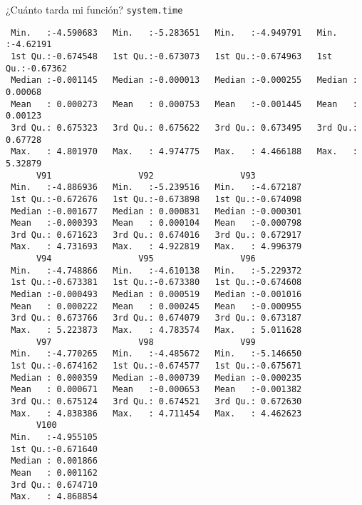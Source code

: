 \documentclass[xcolor={usenames,svgnames,dvipsnames}]{beamer}
\begin{document}
\begin{frame}[label={sec:org4570aee},fragile]{¿Cuánto tarda mi función? \texttt{system.time}}
\begin{verbatim}
 Min.   :-4.590683   Min.   :-5.283651   Min.   :-4.949791   Min.   :-4.62191  
 1st Qu.:-0.674548   1st Qu.:-0.673073   1st Qu.:-0.674963   1st Qu.:-0.67362  
 Median :-0.001145   Median :-0.000013   Median :-0.000255   Median : 0.00068  
 Mean   : 0.000273   Mean   : 0.000753   Mean   :-0.001445   Mean   : 0.00123  
 3rd Qu.: 0.675323   3rd Qu.: 0.675622   3rd Qu.: 0.673495   3rd Qu.: 0.67728  
 Max.   : 4.801970   Max.   : 4.974775   Max.   : 4.466188   Max.   : 5.32879  
      V91                 V92                 V93           
 Min.   :-4.886936   Min.   :-5.239516   Min.   :-4.672187  
 1st Qu.:-0.672676   1st Qu.:-0.673898   1st Qu.:-0.674098  
 Median :-0.001677   Median : 0.000831   Median :-0.000301  
 Mean   :-0.000393   Mean   : 0.000104   Mean   :-0.000798  
 3rd Qu.: 0.671623   3rd Qu.: 0.674016   3rd Qu.: 0.672917  
 Max.   : 4.731693   Max.   : 4.922819   Max.   : 4.996379  
      V94                 V95                 V96           
 Min.   :-4.748866   Min.   :-4.610138   Min.   :-5.229372  
 1st Qu.:-0.673381   1st Qu.:-0.673380   1st Qu.:-0.674608  
 Median :-0.000493   Median : 0.000519   Median :-0.001016  
 Mean   : 0.000222   Mean   : 0.000245   Mean   :-0.000955  
 3rd Qu.: 0.673766   3rd Qu.: 0.674079   3rd Qu.: 0.673187  
 Max.   : 5.223873   Max.   : 4.783574   Max.   : 5.011628  
      V97                 V98                 V99           
 Min.   :-4.770265   Min.   :-4.485672   Min.   :-5.146650  
 1st Qu.:-0.674162   1st Qu.:-0.674577   1st Qu.:-0.675671  
 Median : 0.000359   Median :-0.000739   Median :-0.000235  
 Mean   : 0.000671   Mean   :-0.000653   Mean   :-0.001382  
 3rd Qu.: 0.675124   3rd Qu.: 0.674521   3rd Qu.: 0.672630  
 Max.   : 4.838386   Max.   : 4.711454   Max.   : 4.462623  
      V100          
 Min.   :-4.955105  
 1st Qu.:-0.671640  
 Median : 0.001866  
 Mean   : 0.001162  
 3rd Qu.: 0.674710  
 Max.   : 4.868854
\end{verbatim}
\end{frame}
\end{document}
